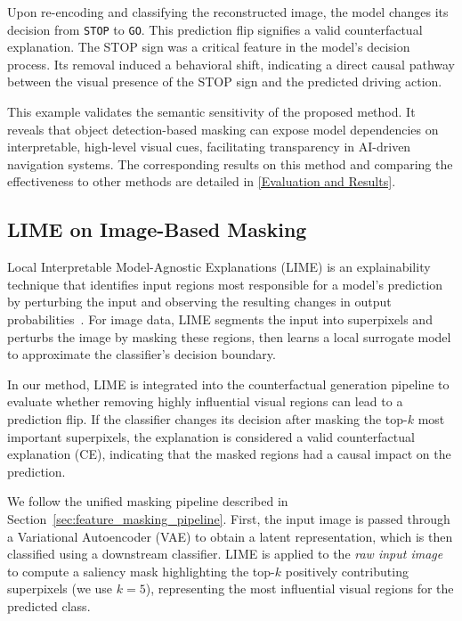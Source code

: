 Upon re-encoding and classifying the reconstructed image, the model changes its decision from \texttt{STOP} to \texttt{GO}. This prediction flip signifies a valid counterfactual explanation. The STOP sign was a critical feature in the model’s decision process. Its removal induced a behavioral shift, indicating a direct causal pathway between the visual presence of the STOP sign and the predicted driving action.

This example validates the semantic sensitivity of the proposed method. It reveals that object detection-based masking can expose model dependencies on interpretable, high-level visual cues, facilitating transparency in AI-driven navigation systems. The corresponding results on this method and comparing the effectiveness to other methods are detailed in \cref{Evaluation and Results}.





\subsection{LIME on Image-Based Masking}
\label{sec:lime_on_images}

Local Interpretable Model-Agnostic Explanations (LIME) is an explainability technique that identifies input regions most responsible for a model’s prediction by perturbing the input and observing the resulting changes in output probabilities~\cite{Ribeiro2018}. For image data, LIME segments the input into superpixels and perturbs the image by masking these regions, then learns a local surrogate model to approximate the classifier’s decision boundary.

In our method, LIME is integrated into the counterfactual generation pipeline to evaluate whether removing highly influential visual regions can lead to a prediction flip. If the classifier changes its decision after masking the top-$k$ most important superpixels, the explanation is considered a valid counterfactual explanation (CE), indicating that the masked regions had a causal impact on the prediction.

We follow the unified masking pipeline described in Section~\ref{sec:feature_masking_pipeline}. First, the input image is passed through a Variational Autoencoder (VAE) to obtain a latent representation, which is then classified using a downstream classifier. LIME is applied to the \emph{raw input image} to compute a saliency mask highlighting the top-$k$ positively contributing superpixels (we use $k=5$), representing the most influential visual regions for the predicted class.

